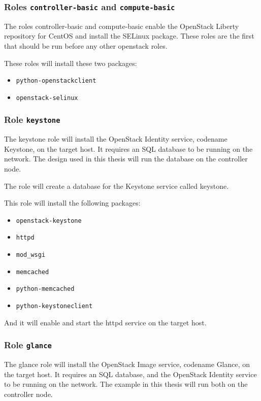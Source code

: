 \subsubsection*{Roles \texttt{controller-basic} and \texttt{compute-basic}}
The roles controller-basic and compute-basic enable the OpenStack Liberty repository for CentOS and install the SELinux package. These roles are the first that should be run before any other openstack roles.

These roles will install these two packages:
\begin{itemize}
  \item{\texttt{python-openstackclient}}
  \item{\texttt{openstack-selinux}}
\end{itemize}

\subsubsection*{Role \texttt{keystone}}
The keystone role will install the OpenStack Identity service, codename Keystone, on the target host. It requires an SQL database to be running on the network. The design used in this thesis will run the database on the controller node.

The role will create a database for the Keystone service called keystone.

This role will install the following packages:
\begin{itemize}
  \item{\texttt{openstack-keystone}}
  \item{\texttt{httpd}}
  \item{\texttt{mod\_wsgi}}
  \item{\texttt{memcached}}
  \item{\texttt{python-memcached}}
  \item{\texttt{python-keystoneclient}}
\end{itemize}
And it will enable and start the httpd service on the target host.



\subsubsection*{Role \texttt{glance}}
The glance role will install the OpenStack Image service, codename Glance, on the target host. It requires an SQL database, and the OpenStack Identity service to be running on the network. The example in this thesis will run both on the controller node.

